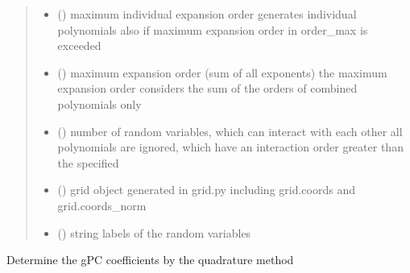 \documentclass[letterpaper,10pt,english,openany,oneside]{sphinxmanual}
\begin{document}
\begin{fulllineitems}
\begin{quote}
\begin{description}
\begin{itemize}
\item {} 
 (\sphinxstyleliteralemphasis{\sphinxupquote{{[}}}\sphinxstyleliteralemphasis{\sphinxupquote{{]} }}) \textendash{} maximum individual expansion order
generates individual polynomials also if maximum expansion order in order\_max is exceeded

\item {} 
 () \textendash{} maximum expansion order (sum of all exponents)
the maximum expansion order considers the sum of the orders of combined polynomials only

\item {} 
 () \textendash{} number of random variables, which can interact with each other
all polynomials are ignored, which have an interaction order greater than the specified

\item {} 
 () \textendash{} grid object generated in grid.py including grid.coords and grid.coords\_norm

\item {} 
 (\sphinxstyleliteralemphasis{\sphinxupquote{{[}}}\sphinxstyleliteralemphasis{\sphinxupquote{{]} }}\sphinxstyleliteralemphasis{\sphinxupquote{, }}\sphinxstyleliteralemphasis{\sphinxupquote{, }}) \textendash{} string labels of the random variables

\end{itemize}

\end{description}\end{quote}

\begin{fulllineitems}
\label{\detokenize{pygpc:pygpc.quad.Quad.get_coeffs}}
Determine the gPC coefficients by the quadrature method


\end{fulllineitems}
\end{fulllineitems}
\end{document}
